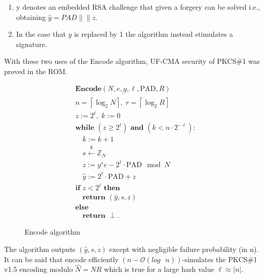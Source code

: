 \documentclass[]{final_report}
\theoremstyle{definition}
\begin{document}
\begin{enumerate}
\item y denotes an embedded RSA challenge that given a forgery can be solved i.e., obtaining \(\widehat{y} = PAD\|\|z \). 
\item In the case that \(y\) is replaced by 1 the algorithm instead stimulates a signature. 
\end{enumerate}
With these two uses of the Encode algorithm, UF-CMA security of PKCS\#1 was proved in the ROM. 

\begin{figure}[H]
\centering
\[
\boxed{
\begin{aligned}
&\underline{\textbf{Encode} (N, e, y, \ell, \text{PAD}, R)} \\
&n = \left\lceil \log_2 N \right\rceil, \; r = \left\lceil \log_2 R \right\rceil \\
&z := 2^\ell, \; k := 0 \\
&\textbf{while } (z \geq 2^\ell) \textbf{ and } (k < n \cdot 2^{-\ell}): \\
&\quad k := k + 1 \\
&\quad s \xleftarrow{\$} \mathbb{Z}_N \\
&\quad z := y^s e - 2^\ell \cdot \text{PAD} \mod N \\
&\quad \widehat{y} := 2^\ell \cdot \text{PAD} + z \\
&\textbf{if } z < 2^\ell \textbf{ then} \\
&\quad \textbf{return } (\widehat{y}, s, z) \\
&\textbf{else} \\
&\quad \textbf{return } \perp.
\end{aligned}
}
\]
\caption{Encode algorithm \cite{jager2018security}}
\label{fig:encode}
\end{figure}

The algorithm outputs \((\widehat{y}, s, z)\) except with negligible failure probability (in n). It can be said that encode efficiently $(n - \mathcal{O}(log \text{ } n))$-simulates the PKCS\#1 v1.5 encoding modulo $\hat{N} = NR$ which is true for a large hash value $\ell \approx |n|$.

\end{document}
